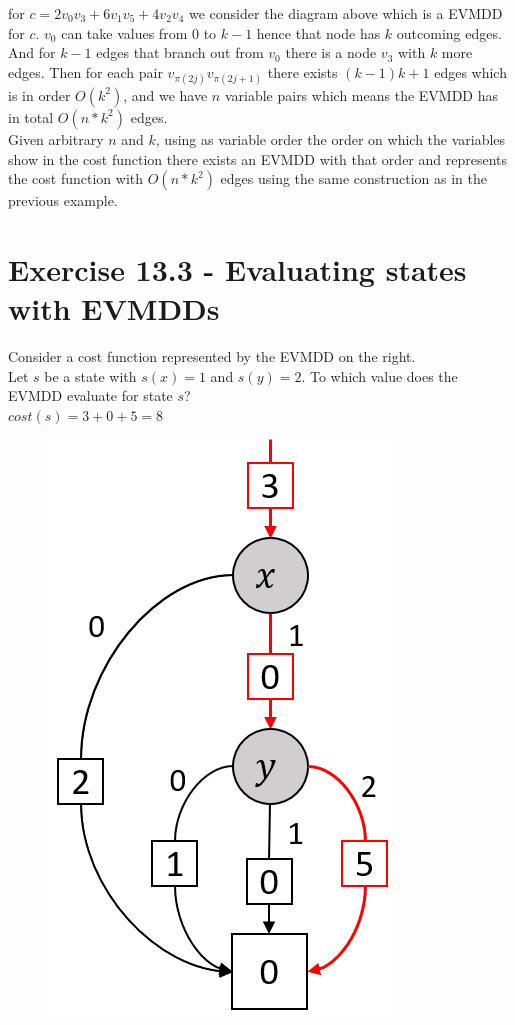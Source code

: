 \documentclass[11pt,a4paper]{article}
\begin{document}
for $c=2v_0v_3 + 6v_1v_5 + 4v_2v_4$ we consider the diagram above
which is a EVMDD for $c$. $v_0$ can take values from $0$ to $k-1$ 
hence that node has $k$ outcoming edges. And for $k-1$ edges that
branch out from $v_0$ there is a node $v_3$ with $k$ more edges.
Then for each pair $v_{\pi(2j)}v_{\pi(2j+1)}$ there exists $(k-1)k + 1$ edges
which is in order $O(k^2)$, and we have $n$ variable pairs 
which means the EVMDD has in total $O(n*k^2)$ edges.\\

Given arbitrary $n$ and $k$, using as variable order
the order on which the variables show in the cost function
there exists an EVMDD with that order and represents the cost function
with $O(n*k^2)$ edges using the same construction as in the previous example.

\pagebreak
\section*{Exercise 13.3 - Evaluating states with EVMDDs}
Consider a cost function represented by the EVMDD on the right.\\
Let $s$ be a state with $s(x) = 1$ and $s(y) = 2$. To which value does the
EVMDD evaluate for state $s$?\\
$cost(s) = 3 + 0 + 5 = 8$
\begin{figure}[h!]
	\centering
	\includegraphics[scale=0.5]{13_3.png}
\end{figure}
\\
\end{document}
